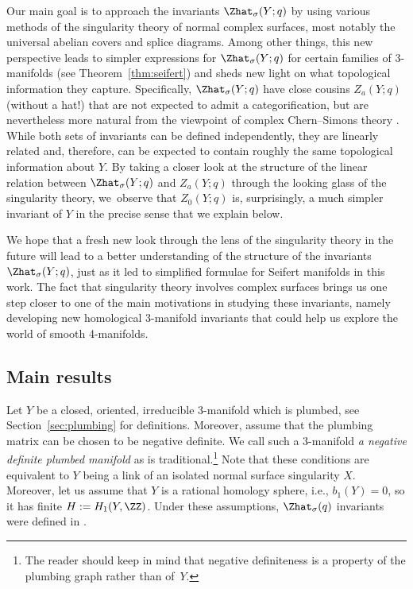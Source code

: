 \documentclass[pdftex]{sigma}
\begin{document}
Our main goal is to approach the invariants $\Zhat_{\sigma}(Y; q)$ by using various methods of the singularity theory of normal complex surfaces, most notably the universal abelian covers and splice diagrams. Among other things, this new perspective leads to simpler expressions for $\Zhat_{\sigma}(Y; q)$ for certain families of 3-manifolds (see Theorem~\ref{thm:seifert}) and sheds new light on what topological information they capture.
Specifically, $\Zhat_{\sigma}(Y; q)$ have close cousins $Z_a(Y; q)$ (without a hat!) that are not expected to admit a categorification, but are nevertheless more natural from the viewpoint of complex Chern--Simons theory \cite{GMP16}. While both sets of invariants can be defined independently, they are linearly related and, therefore, can be expected to contain roughly the same topological information about $Y$. By taking a closer look at the structure of the linear relation between $\Zhat_{\sigma}(Y; q)$ and $Z_a(Y; q)$ through the looking glass of the singularity theory, we~observe that $Z_0(Y; q)$ is, surprisingly, a much simpler invariant of $Y$ in the precise sense that we explain below.

We hope that a fresh new look through the lens of the singularity theory in the future will lead to a better understanding of the structure of the invariants $\Zhat_{\sigma}(Y; q)$, just as it led to simplified formulae for Seifert manifolds in this work. The fact that singularity theory involves complex surfaces brings us one step closer to one of the main motivations in studying these invariants, namely developing new homological 3-manifold invariants that could help us explore the world of smooth 4-manifolds.

\subsection{Main results}\label{ss:main_results}

Let $Y$ be a closed, oriented, irreducible 3-manifold which is plumbed, see Section~\ref{sec:plumbing} for definitions. Moreover, assume that the plumbing matrix can be chosen to be negative definite. We call such a 3-manifold \emph{a negative definite plumbed manifold} as is traditional.\footnote{The reader should keep in mind that negative definiteness is a property of the plumbing graph rather than of~$Y$.} Note that these conditions are equivalent to $Y$ being a link of an isolated normal surface singularity $X$. Moreover, let us assume that $Y$ is a rational homology sphere, i.e., $b_1(Y)=0$, so it has finite $H:=H_1(Y,\ZZ)$. Under these assumptions, $\Zhat_\sigma(q)$ invariants were defined in \cite{GPPV20}.
\end{document}
